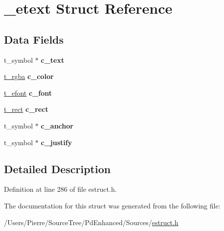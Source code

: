 \hypertarget{struct__etext}{\section{\-\_\-etext Struct Reference}
\label{struct__etext}
}
\subsection*{Data Fields}
\begin{DoxyCompactItemize}
\item 
\hypertarget{struct__etext_ac054c96b035a5f1a859bc8e46b636920}{t\-\_\-symbol $\ast$ {\bfseries c\-\_\-text}}\label{struct__etext_ac054c96b035a5f1a859bc8e46b636920}

\item 
\hypertarget{struct__etext_a8c9f65e6b5d93662d9b40a38b40a3a91}{\hyperlink{struct__rgba}{t\-\_\-rgba} {\bfseries c\-\_\-color}}\label{struct__etext_a8c9f65e6b5d93662d9b40a38b40a3a91}

\item 
\hypertarget{struct__etext_a5a04aa88bfa7e501cc22e79911ec6322}{\hyperlink{struct__efont}{t\-\_\-efont} {\bfseries c\-\_\-font}}\label{struct__etext_a5a04aa88bfa7e501cc22e79911ec6322}

\item 
\hypertarget{struct__etext_a3ad11827ad04fba1ba8cb1d853ad18dc}{\hyperlink{struct__rect}{t\-\_\-rect} {\bfseries c\-\_\-rect}}\label{struct__etext_a3ad11827ad04fba1ba8cb1d853ad18dc}

\item 
\hypertarget{struct__etext_aa5be622725b7ca85ad685a94104ab3fd}{t\-\_\-symbol $\ast$ {\bfseries c\-\_\-anchor}}\label{struct__etext_aa5be622725b7ca85ad685a94104ab3fd}

\item 
\hypertarget{struct__etext_a882eef71064831d5e3671b5a06cd0a1d}{t\-\_\-symbol $\ast$ {\bfseries c\-\_\-justify}}\label{struct__etext_a882eef71064831d5e3671b5a06cd0a1d}

\end{DoxyCompactItemize}


\subsection{Detailed Description}


Definition at line 286 of file estruct.\-h.



The documentation for this struct was generated from the following file\-:\begin{DoxyCompactItemize}
\item 
/\-Users/\-Pierre/\-Source\-Tree/\-Pd\-Enhanced/\-Sources/\hyperlink{estruct_8h}{estruct.\-h}\end{DoxyCompactItemize}
